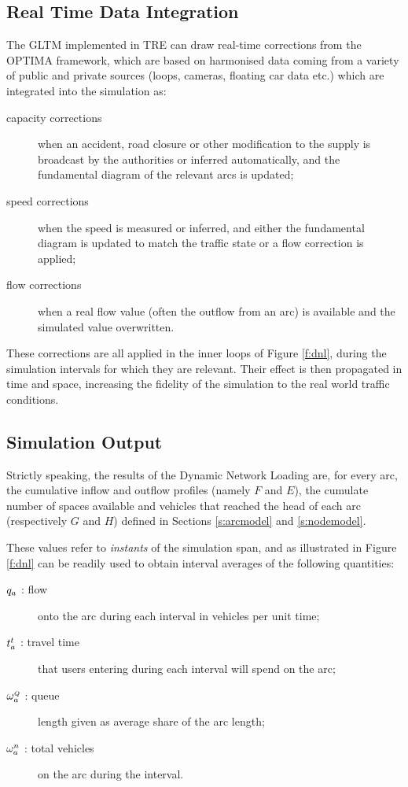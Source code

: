 \subsection{Real Time Data Integration}
The GLTM implemented in TRE can draw real-time corrections from the OPTIMA framework, which are based on harmonised data coming from a variety of public and private sources (loops, cameras, floating car data etc.) which are integrated into the simulation as:
\begin{description}
\item[capacity corrections] when an accident, road closure or other modification to the supply is broadcast by the authorities or inferred automatically, and the fundamental diagram of the relevant arcs is updated;
\item[speed corrections] when the speed is measured or inferred, and either the fundamental diagram is updated to match the traffic state or a flow correction is applied;
\item[flow corrections] when a real flow value (often the outflow from an arc) is available and the simulated value overwritten.
\end{description}

These corrections are all applied in the inner loops of Figure \ref{f:dnl}, during the simulation intervals for which they are relevant. Their effect is then propagated in time and space, increasing the fidelity of the simulation to the real world traffic conditions.


\subsection{Simulation Output} \label{s:output}
Strictly speaking, the results of the Dynamic Network Loading are, for every arc, the cumulative inflow and outflow profiles (namely $F$ and $E$), the cumulate number of spaces available and vehicles that reached the head of each arc (respectively $G$ and $H$) defined in Sections \ref{s:arcmodel} and \ref{s:nodemodel}.

These values refer to \emph{instants} of the simulation span, and as illustrated in Figure \ref{f:dnl}  can be readily used to obtain interval averages of the following quantities:
\begin{description}
\item[$q_a$ : flow]  onto the arc during each interval in vehicles per unit time;

\item[$t_{a}^t$ : travel time]  that users entering during each interval will spend on the arc; 

\item[$\omega_{a}^{\scriptscriptstyle{Q}}$ : queue] length given as average share of the arc length;

\item[$\omega_{a}^{n}$ : total vehicles] on the arc during the interval.
\end{description}


